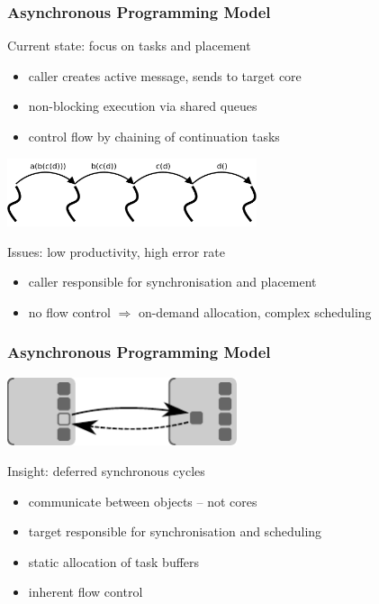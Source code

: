 \documentclass[9pt]{beamer}
\begin{document}
\begin{frame}
  \frametitle{Asynchronous Programming Model}
  
  \begin{block}{Current state: focus on tasks and placement}
    \begin{itemize}
    \item caller creates active message, sends to target core
    \item non-blocking execution via shared queues
    \item control flow by chaining of continuation tasks
    \end{itemize}
  \end{block}

  \vfill
  \begin{center}
    \includegraphics[height=2cm]{figures/continuations.pdf}
  \end{center}
  \vfill

  \begin{block}{Issues: low productivity, high error rate}
    \begin{itemize}
    \item caller responsible for synchronisation and placement
    \item no flow control $\Rightarrow$ on-demand allocation, complex scheduling
    \end{itemize}
  \end{block}
\end{frame}
  
\begin{frame}
  \frametitle{Asynchronous Programming Model}

  \vfill
  \begin{center}
  \includegraphics[height=2cm]{figures/asyncobj.pdf}
  \end{center}
  \vfill

  \begin{block}{Insight: deferred synchronous cycles}
    \begin{itemize}
    \item communicate between objects -- not cores
    \item target responsible for synchronisation and scheduling
    \item static allocation of task buffers
    \item inherent flow control
    \end{itemize}
  \end{block}
\end{frame}
\end{document}
